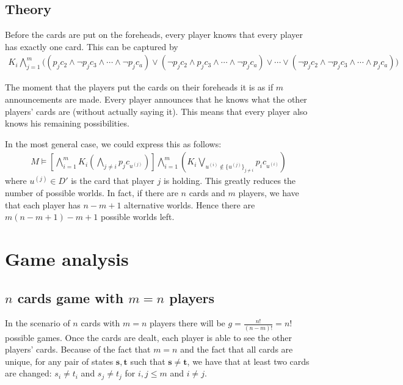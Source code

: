 \documentclass[a4paper,10pt]{article}
\begin{document}
\subsection{Theory}
Before the cards are put on the foreheads, every player knows that every player has exactly one card. This can be captured by
\begin{align*}
 K_i \bigwedge_{j=1}^m \bigg((p_j c_2 \wedge \neg p_j c_3 \wedge \cdots \wedge \neg p_j c_a) \vee (\neg p_j c_2 \wedge p_j c_3 \wedge \cdots \wedge \neg p_j c_a) \vee \cdots \vee (\neg p_j c_2 \wedge \neg p_j c_3 \wedge \cdots \wedge p_j c_a) \bigg)
\end{align*}

The moment that the players put the cards on their foreheads it is as if $m$ announcements are made. Every player announces that he knows what the other players' cards are (without actually saying it). This means that every player also knows his remaining possibilities.

In the most general case, we could express this as follows:
\begin{align*}
 M \models \left[ \bigwedge_{i=1}^m K_i \left(\bigwedge_{j\neq i} p_j c_{u^{(j)}} \right) \right] \bigwedge_{i=1}^m \left( K_i \bigvee_{u^{(i)} \notin \{ u^{(j)} \}_{j\neq i}} p_i c_{u^{(i)}} \right)
\end{align*}
where $u^{(j)} \in D'$ is the card that player $j$ is holding. This greatly reduces the number of possible worlds. In fact, if there are $n$ cards and $m$ players, we have that each player has $n-m+1$ alternative worlds. Hence there are $m(n-m+1) - m +1$ possible worlds left. 


\section{Game analysis}
\subsection{$n$ cards game with $m=n$ players}
In the scenario of $n$ cards with $m=n$ players there will be $\displaystyle g = \frac{n!}{(n-m)!} = n!$ possible games. Once the cards are dealt, each player is able to see the other players' cards. Because of the fact that $m=n$ and the fact that all cards are unique, for any pair of states $\boldsymbol s, \boldsymbol t$ such that $\boldsymbol s \neq \boldsymbol t$, we have that at least two cards are changed: $s_i \neq t_i$ and $s_j \neq t_j$ for $i,j\leq m$ and $i\neq j$.
\end{document}
